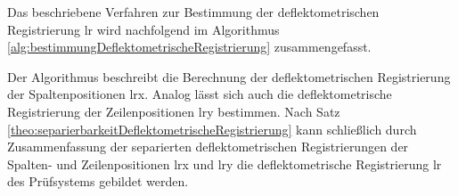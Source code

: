 \p
Das beschriebene Verfahren zur Bestimmung der deflektometrischen Registrierung \acrshort{lr} wird nachfolgend im Algorithmus \ref{alg:bestimmungDeflektometrischeRegistrierung} zusammengefasst.

{
	\FloatBarrier
	
}

\noindent
Der Algorithmus beschreibt die Berechnung der deflektometrischen Registrierung der Spaltenpositionen \acrshort{lrx}.
Analog lässt sich auch die deflektometrische Registrierung der Zeilenpositionen \acrshort{lry} bestimmen.
Nach Satz \ref{theo:separierbarkeitDeflektometrischeRegistrierung} kann schließlich durch Zusammenfassung der separierten deflektometrischen Registrierungen der Spalten- und Zeilenpositionen \acrshort{lrx} und \acrshort{lry} die deflektometrische Registrierung \acrshort{lr} des Prüfsystems gebildet werden.